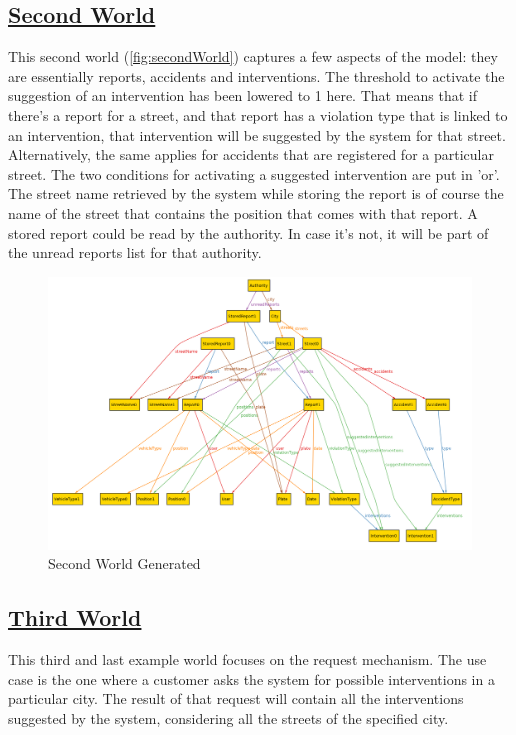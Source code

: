 	\subsection[Second World]{\hyperlink{toc}{Second World}}
	This second world (\autoref{fig:secondWorld}) captures a few aspects of the model: they are essentially reports, accidents and interventions. The threshold to activate the suggestion of an intervention has been lowered to 1 here. That means that if there's a report for a street, and that report has a violation type that is linked to an intervention, that intervention will be suggested by the system for that street. Alternatively, the same applies for accidents that are registered for a particular street. The two conditions for activating a suggested intervention are put in 'or'.
	The street name retrieved by the system while storing the report is of course the name of the street that contains the position that comes with that report.
	A stored report could be read by the authority. In case it's not, it will be part of the unread reports list for that authority.
	
	\begin{figure}[hbtp]
		\centering
		\includegraphics[scale=0.4, angle=90]{Files/alloy/world2.png}
		\caption{\label{fig:secondWorld}Second World Generated}
	\end{figure}
	
	\FloatBarrier
	\subsection[Third World]{\hyperlink{toc}{Third World}}
	This third and last example world focuses on the request mechanism. The use case is the one where a customer asks the system for possible interventions in a particular city. The result of that request will contain all the interventions suggested by the system, considering all the streets of the specified city.
	
